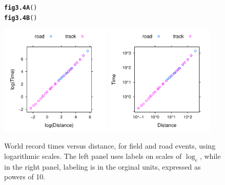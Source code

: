 \documentclass[12pt, a4paper,  BCOR=8.25mm, DIV=15]{scrartcl}\usepackage[]{graphicx}\usepackage[]{color}
\makeatletter
\newcommand{\hlstd}[1]{\textcolor[rgb]{0.345,0.345,0.345}{#1}}%
\newcommand{\hlkwd}[1]{\textcolor[rgb]{0.737,0.353,0.396}{\textbf{#1}}}%
\newenvironment{kframe}{%
 \def\at@end@of@kframe{}%
 \ifinner\ifhmode%
  \def\at@end@of@kframe{\end{minipage}}%
  \begin{minipage}{\columnwidth}%
 \fi\fi%
 \def\FrameCommand##1{\hskip\@totalleftmargin \hskip-\fboxsep
 \colorbox{shadecolor}{##1}\hskip-\fboxsep
     \hskip-\linewidth \hskip-\@totalleftmargin \hskip\columnwidth}%
 \MakeFramed {\advance\hsize-\width
   \@totalleftmargin\z@ \linewidth\hsize
   \@setminipage}}%
 {\par\unskip\endMakeFramed%
 \at@end@of@kframe}
\newenvironment{knitrout}{}{} %
\makeatother
\begin{document}
\begin{figure}
\begin{knitrout}
\color{fgcolor}\begin{kframe}
\begin{alltt}
\hlkwd{fig3.4A}\hlstd{()}
\hlkwd{fig3.4B}\hlstd{()}
\end{alltt}
\end{kframe}

{\centering \includegraphics[width=0.47\textwidth]{figure/exs-fig3_4e-1} 
\includegraphics[width=0.47\textwidth]{figure/exs-fig3_4e-2} 

}



\end{knitrout}
\caption{World record times versus distance, for field and road
  events, using logarithmic scales.  The left panel uses labels on
  scales of $\log_e$, while in the right panel, labeling is in the
  orginal units, expressed as powers of 10.}
\label{fig:wrlog}
\end{figure}
\end{document}
